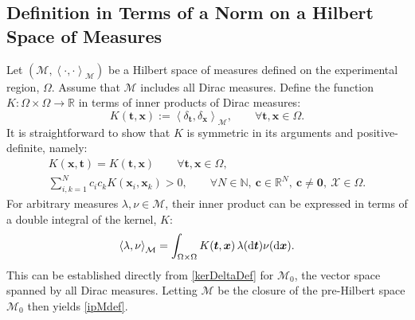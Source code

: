 \documentclass[graybox]{svmult}
\newcommand{\reals}{\mathbb{R}}
\newcommand{\vc}{\boldsymbol{c}}
\newcommand{\vx}{\boldsymbol{x}}
\newcommand{\vt}{\boldsymbol{t}}
\newcommand{\vzero}{\boldsymbol{0}}
\newcommand{\dif}{{\rm d}}
\newcommand{\Xdes}{\mathcal{X}}
\newcommand{\cm}{\mathcal{M}}
\newcommand{\ip}[3][{}]{\ensuremath{\left \langle #2, #3 \right \rangle_{#1}}}
\begin{document}
\subsection{Definition in Terms of a Norm on a Hilbert Space of Measures}

Let $(\cm, \ip[\cm]{\cdot}{\cdot})$ be a Hilbert space of measures defined on the experimental region, $\Omega$.  Assume that $\cm$ includes all Dirac measures.  Define the function $K:\Omega \times \Omega \to \reals$ in terms of inner products of Dirac measures:
\begin{equation} \label{kerDeltaDef}
    K(\vt,\vx) := \ip[\cm]{\delta_{\vt}}{\delta_{\vx}}, \qquad \forall \vt, \vx \in \Omega.
\end{equation}
It is straightforward to show that $ K$ is symmetric in its arguments and positive-definite, namely:
\begin{gather*}
K(\vx, \vt) = K(\vt, \vx) \qquad \forall \vt, \vx\in \Omega,\\
\sum\limits_{i, k=1}^N c_i c_k  K(\vx_i,\vx_k) > 0, \qquad \forall N\in\mathbb{N}, \  \vc \in\mathbb{R}^N, \ \vc \ne \vzero,  \ \Xdes \in\Omega.
\end{gather*}
For arbitrary measures $\lambda, \nu \in \cm$, their inner product can be expressed in terms of a double integral of the kernel, $K$:
\begin{equation} \label{ipMdef}
    \ip[\cm]{\lambda}{\nu} = \int_{\Omega \times \Omega} K(\vt,\vx) \, \lambda(\dif \vt) \nu(\dif \vx).
\end{equation}
This can be established directly from \eqref{kerDeltaDef} for $\cm_0$, the vector space spanned by all Dirac measures.  Letting $\cm$ be the closure of the pre-Hilbert space $\cm_0$ then yields \eqref{ipMdef}.
\end{document}
